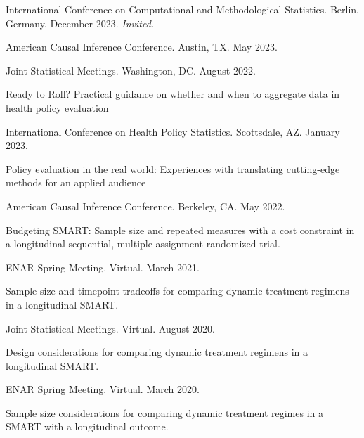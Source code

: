 \documentclass[letterpaper,11pt]{article} %
\begin{document}
\begin{etaremune}
		\begin{conflist}
			\item International Conference on Computational and Methodological Statistics. Berlin, Germany. December 2023. \textit{Invited.}
			\item American Causal Inference Conference. Austin, TX. May 2023.
			\item Joint Statistical Meetings. Washington, DC. August 2022.
		\end{conflist}
		\item Ready to Roll? Practical guidance on whether and when to aggregate data in health policy evaluation
		\begin{conflist}
			\item International Conference on Health Policy Statistics. Scottsdale, AZ. January 2023.
		\end{conflist}\item Policy evaluation in the real world: Experiences with translating cutting-edge methods for an applied audience
		\begin{conflist}
			\item American Causal Inference Conference. Berkeley, CA. May 2022.
		\end{conflist}
		\item Budgeting SMART: Sample size and repeated measures with a cost  constraint in a longitudinal sequential, multiple-assignment randomized trial.
		\begin{conflist}
			\item  ENAR Spring Meeting. Virtual. March 2021.
		\end{conflist}
		\item Sample size and timepoint tradeoffs for comparing dynamic treatment regimens in a longitudinal SMART.
		\begin{conflist}
			\item Joint Statistical Meetings. Virtual. August 2020.
		\end{conflist}
		\item Design considerations for comparing dynamic treatment regimens  in a longitudinal SMART.
		\begin{conflist}
			\item ENAR Spring Meeting. Virtual. March 2020.
		\end{conflist}
		\item Sample size considerations for comparing dynamic treatment regimes in a SMART with a longitudinal outcome.
		\begin{conflist}

\end{conflist}
\end{etaremune}
\end{document}
